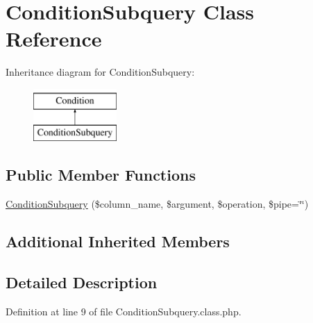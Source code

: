 \hypertarget{classConditionSubquery}{\section{Condition\-Subquery Class Reference}
\label{classConditionSubquery}
}
Inheritance diagram for Condition\-Subquery\-:\begin{figure}[H]
\begin{center}
\leavevmode
\includegraphics[height=2.000000cm]{classConditionSubquery}
\end{center}
\end{figure}
\subsection*{Public Member Functions}
\begin{DoxyCompactItemize}
\item 
\hyperlink{classConditionSubquery_a5dd42cd7316837c2b63fe9b6d5703958}{Condition\-Subquery} (\$column\-\_\-name, \$argument, \$operation, \$pipe=\char`\"{}\char`\"{})
\end{DoxyCompactItemize}
\subsection*{Additional Inherited Members}


\subsection{Detailed Description}


Definition at line 9 of file Condition\-Subquery.\-class.\-php.




